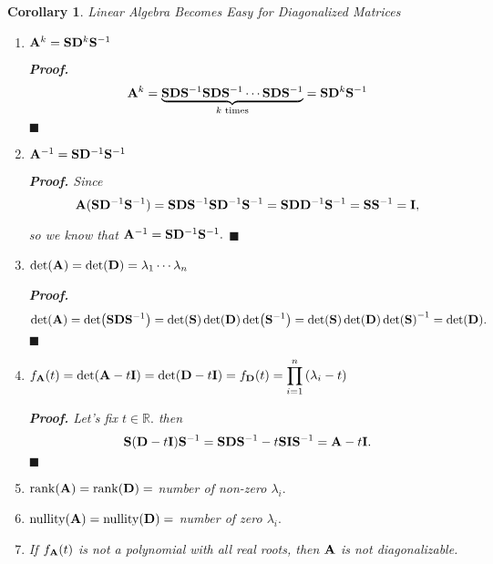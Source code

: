 \documentclass[12pt, a4paper]{article}
\newtheorem{cor}{Corollary}[section]
\newenvironment*{prf}{\par\indent\textbf{\textit{Proof. }}}{\hfill $\blacksquare$\par}
\def\R{{\mathbb{R}}}
\def\rank{\mathrm{rank}}
\def\nullity{\mathrm{nullity}}
\def\matrixA{\vb{A}}
\def\matrixD{\vb{D}}
\def\matrixI{\vb{I}}
\def\matrixS{\vb{S}}
\def\dsst{\displaystyle}
\begin{document}
\begin{cor}Linear Algebra Becomes Easy for Diagonalized Matrices
	\begin{enumerate}
		\item $\matrixA^{k}=\matrixS\matrixD^{k}\matrixS^{-1}$
		\begin{prf}
			\[\matrixA^{k}=\underbrace{\matrixS\matrixD\matrixS^{-1}\matrixS\matrixD\matrixS^{-1}\cdots\matrixS\matrixD\matrixS^{-1}}_{k\text{ times}}=\matrixS\matrixD^{k}\matrixS^{-1}\]
		\end{prf}
		\item $\matrixA^{-1}=\matrixS\matrixD^{-1}\matrixS^{-1}$
		\begin{prf}
			Since \[\matrixA(\matrixS\matrixD^{-1}\matrixS^{-1})=\matrixS\matrixD\matrixS^{-1}\matrixS\matrixD^{-1}\matrixS^{-1}=\matrixS\matrixD\matrixD^{-1}\matrixS^{-1}=\matrixS\matrixS^{-1}=\matrixI,\]\par so we know that $\matrixA^{-1}=\matrixS\matrixD^{-1}\matrixS^{-1}.$
		\end{prf}
		\item $\det(\matrixA)=\det(\matrixD)=\lambda_1\cdots\lambda_n$
		\begin{prf}
			\[\det(\matrixA)=\det(\matrixS\matrixD\matrixS^{-1})=\det(\matrixS)\det(\matrixD)\det(\matrixS^{-1})=\det(\matrixS)\det(\matrixD)\det(\matrixS)^{-1}=\det(\matrixD).\]
		\end{prf}
		\item $f_{\matrixA}(t)=\det(\matrixA-t\matrixI)=\det(\matrixD-t\matrixI)=f_{\matrixD}(t)=\dsst\prod_{i=1}^n\qty(\lambda_i-t)$
		\begin{prf}
			Let's fix $t\in\R.$ then \[\matrixS(\matrixD-t\matrixI)\matrixS^{-1}=\matrixS\matrixD\matrixS^{-1}-t\matrixS\matrixI\matrixS^{-1}=\matrixA-t\matrixI.\]
		\end{prf}
		\item $\rank(\matrixA)=\rank(\matrixD)=$ number of non-zero $\lambda_i.$
		\item $\nullity(\matrixA)=\nullity(\matrixD)=$ number of zero $\lambda_i.$
		\item If $f_{\matrixA}(t)$ is not a polynomial with all real roots, then $\matrixA$ is not diagonalizable. 
	\end{enumerate}
\end{cor}
\end{document}
